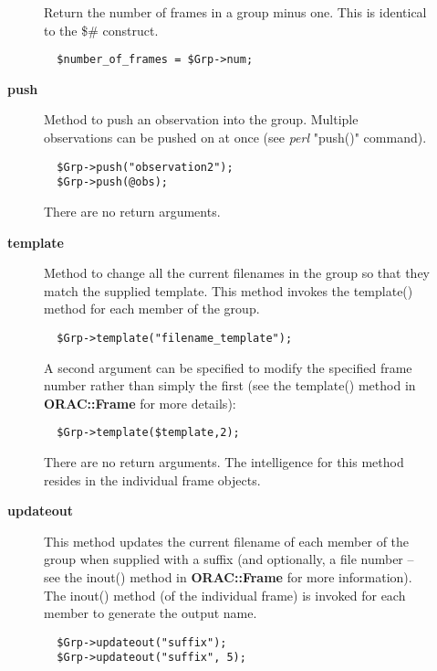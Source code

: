 \begin{description}
\begin{description}
Return the number of frames in a group minus one.
This is identical to the \$\# construct.

\begin{verbatim}
  $number_of_frames = $Grp->num;
\end{verbatim}

\item[{\textbf{push}}] \mbox{}

Method to push an observation into the group. Multiple observations
can be pushed on at once (see \emph{perl} "push()" command).

\begin{verbatim}
  $Grp->push("observation2");
  $Grp->push(@obs);
\end{verbatim}


There are no return arguments.


\item[{\textbf{template}}] \mbox{}

Method to change all the current filenames in the group so that they
match the supplied template. This method invokes the template()
method for each member of the group.

\begin{verbatim}
  $Grp->template("filename_template");
\end{verbatim}


A second argument can be specified to modify the specified frame
number rather than simply the first (see the template() method
in \textbf{ORAC::Frame} for more details):

\begin{verbatim}
  $Grp->template($template,2);
\end{verbatim}


There are no return arguments. The intelligence for this method resides
in the individual frame objects.


\item[{\textbf{updateout}}] \mbox{}

This method updates the current filename of each member of the group
when supplied with a suffix (and optionally, a file number -- see the
inout() method in \textbf{ORAC::Frame} for more information). The inout() 
method (of the individual frame) is invoked for each member to 
generate the output name.

\begin{verbatim}
  $Grp->updateout("suffix");
  $Grp->updateout("suffix", 5);
\end{verbatim}



\end{description}
\end{description}
